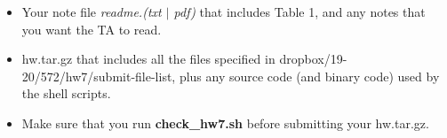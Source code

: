 \documentclass[11pt]{article}
\begin{document}
\begin{itemize}

    \item Your note file {\it readme.(txt $\mid$ pdf)}
    that includes Table 1, and any notes that you want the TA to read.
      

  \item  hw.tar.gz that includes all the files specified in
      dropbox/19-20/572/hw7/submit-file-list, plus any source code
      (and binary code) used by the shell scripts.

  \item Make sure that you run {\bf check\_hw7.sh} before
    submitting your hw.tar.gz.
    

  
  

\end{itemize}
\end{document}
